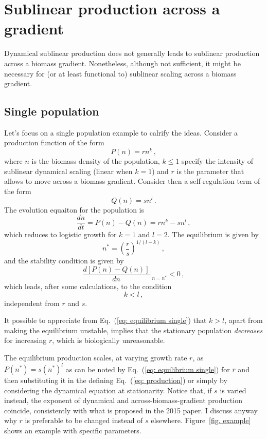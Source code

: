 \documentclass[10pt]{article}
\begin{document}
\section{Sublinear production across a gradient}
Dynamical sublinear production does not generally leads to 
sublinear production across a biomass gradient.
Nonetheless, although not sufficient, it might be necessary for (or at least
functional to) sublinear scaling across a biomass gradient.

\subsection{Single population}
Let's focus on a single population example to calrify the ideas.
Consider a production function of the form
\begin{equation}
    P(n) = r n^k \, ,
\label{eq: production}
\end{equation}
where $n$ is the biomass density of the population, $k\leq1$
specify the intensity of sublinear dynamical scaling (linear when $k=1$) 
and $r$ is the parameter that allows to move across a biomass gradient.
Consider then a self-regulation term of the form
\begin{equation}
    Q(n) = s n^l \, .
\end{equation} 
The evolution equaiton for the population is 
\begin{equation}
    \frac{dn}{dt} = P(n) - Q(n) = r n^k - s n^l \, ,
\end{equation} 
which reduces to logistic growth for $k=1$ and $l=2$.
The equilibrium is given by
\begin{equation}
    n^* = \left(\frac{r}{s}\right)^{1/(l-k)} \, ,
\label{eq: equilibrium single}
\end{equation}
and the stability condition is given by
\begin{equation}
    \frac{d\left[P(n)-Q(n)\right]}{dn}\bigg|_{n=n^*} < 0 \, ,
\end{equation}
which leads, after some calculations, to the condition
\begin{equation}
    k<l \, ,
\end{equation}
independent from $r$ and $s$.

It possible to appreciate from Eq.~(\ref{eq: equilibrium single})
that $k>l$, apart from making the equilibrium unstable, implies that
the stationary population \textit{decreases} for increasing $r$,
which is biologically unreasonable.

The equilibrium production scales, at varying growth rate $r$,
as $P(n^*)=s(n^*)^l$ as can be noted by Eq.~(\ref{eq: equilibrium single})
for $r$ and then substituting it in the defining Eq.~(\ref{eq: production})
or simply by considering the dynamical equation at stationarity.
Notice that, if $s$ is varied instead, the exponent
of dynamical and across-biomass-gradient production coincide, 
consistently with what is proposed in the 2015 paper.
I discuss anyway why $r$ is preferable to be changed instead of $s$ elsewhere.
Figure~\ref{fig. example} shows an example with specific parameters.
\end{document}
